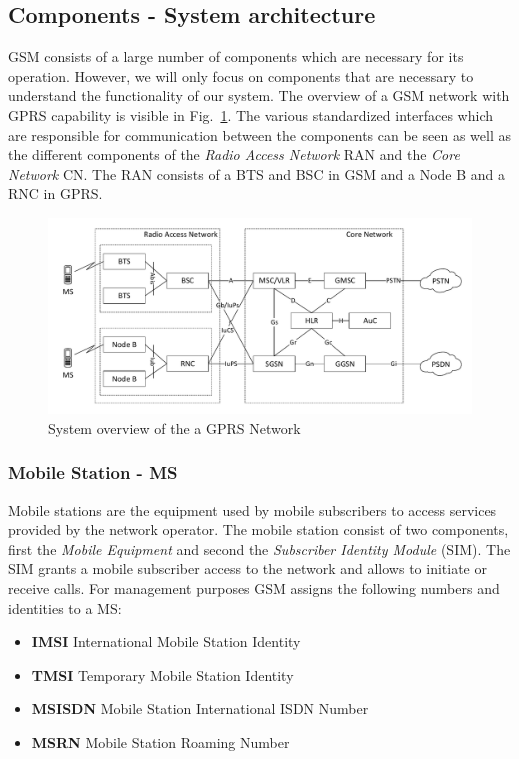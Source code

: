 \subsection{Components - System architecture}
GSM consists of a large number of components which are necessary for its operation. However, we will only focus on components that are necessary to understand the functionality of our system. The overview of a GSM network with GPRS capability is visible in Fig.\ \ref{fig:GSMNetwork}.  The various standardized interfaces which are responsible for communication between the components can be seen as well as the different components of the \emph{Radio Access Network} RAN and the \emph{Core Network} CN. The RAN consists of a BTS and BSC in GSM and a Node B and a RNC in GPRS.
\begin{figure}
	\centering
	\includegraphics[width=\linewidth]{./images/GSMNetwork}
	\caption{System overview of the a GPRS Network}
	\label{fig:GSMNetwork}
\end{figure}

\subsubsection{Mobile Station - MS}
Mobile stations are the equipment used by mobile subscribers to access services provided by the network operator. The mobile station consist of two components, first the \emph{Mobile Equipment} and second the \emph{Subscriber Identity Module} (SIM). The SIM grants a mobile subscriber access to the network and allows to initiate or receive calls.
For management purposes GSM assigns the following numbers and identities to a MS:
\begin{itemize}
	\item \textbf{IMSI} International Mobile Station Identity
	\item \textbf{TMSI} Temporary Mobile Station Identity
	\item \textbf{MSISDN} Mobile Station International ISDN Number
	\item \textbf{MSRN} Mobile Station Roaming Number
	      
\end{itemize}
